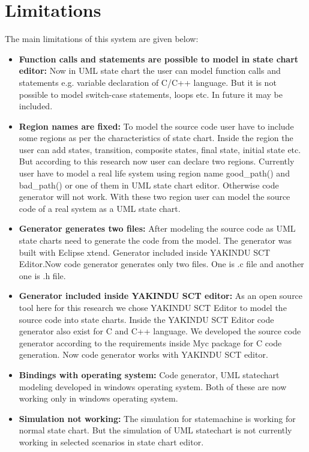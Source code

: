 \chapter{Limitations}
The main limitations of this system are given below:
\begin{itemize}
	\item \textbf{Function calls and statements are possible to model in state chart editor:} Now in UML state chart the user can model function calls and statements e.g. variable declaration of C/C++ language. But it is not possible to model switch-case statements, loops etc. In future it may be included.
	
	\item \textbf{Region names are fixed:} To model the source code user have to include some regions as per the characteristics of state chart. Inside the region the user can add states, transition, composite states, final state, initial state etc. But according to this research now user can declare two regions. Currently user have to model a real life system using region name good\_path() and bad\_path() or one of them in UML state chart editor. Otherwise code generator will not work. With these two region user can model the source code of a real system as a UML state chart. 
	
	\item \textbf{Generator generates two files:} After modeling the source code as UML state charts need to generate the code from the model. The generator was built with Eclipse xtend. Generator included inside YAKINDU SCT Editor.Now code generator generates only two files. One is .c file and another one is .h file.
	
	\item \textbf{Generator included inside YAKINDU SCT editor:} As an open source tool here for this research we chose YAKINDU SCT Editor to model the source code into state charts. Inside the YAKINDU SCT Editor code generator also exist for C and C++ language. We developed the source code generator according to the requirements inside Myc package for C code generation. Now code generator works with YAKINDU SCT editor.
	
	
	\item \textbf{Bindings with operating system:}  Code generator, UML statechart modeling developed in windows operating system. Both of these are now working only in windows operating system.
	
	\item \textbf{Simulation not working:} The simulation for statemachine is working for normal state chart. But the simulation of UML statechart is not currently working in selected scenarios in state chart editor.
	

\end{itemize}
